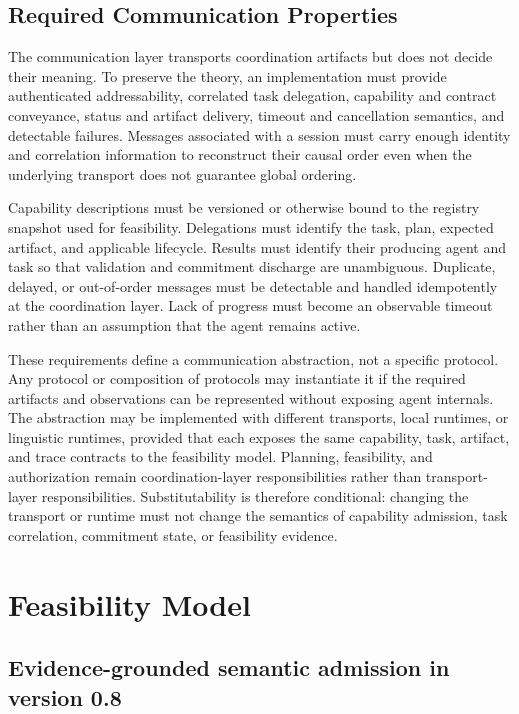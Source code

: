 \subsection{Required Communication Properties}
\label{sec:protocol}

The communication layer transports coordination artifacts but does not decide their meaning. To preserve the theory, an implementation must provide authenticated addressability, correlated task delegation, capability and contract conveyance, status and artifact delivery, timeout and cancellation semantics, and detectable failures. Messages associated with a session must carry enough identity and correlation information to reconstruct their causal order even when the underlying transport does not guarantee global ordering.

Capability descriptions must be versioned or otherwise bound to the registry snapshot used for feasibility. Delegations must identify the task, plan, expected artifact, and applicable lifecycle. Results must identify their producing agent and task so that validation and commitment discharge are unambiguous. Duplicate, delayed, or out-of-order messages must be detectable and handled idempotently at the coordination layer. Lack of progress must become an observable timeout rather than an assumption that the agent remains active.

These requirements define a communication abstraction, not a specific protocol. Any protocol or composition of protocols may instantiate it if the required artifacts and observations can be represented without exposing agent internals. The abstraction may be implemented with different transports, local runtimes, or linguistic runtimes, provided that each exposes the same capability, task, artifact, and trace contracts to the feasibility model. Planning, feasibility, and authorization remain coordination-layer responsibilities rather than transport-layer responsibilities. Substitutability is therefore conditional: changing the transport or runtime must not change the semantics of capability admission, task correlation, commitment state, or feasibility evidence.

\section{Feasibility Model}
\label{sec:feasibility-boundary}

\subsection{Evidence-grounded semantic admission in version 0.8}


